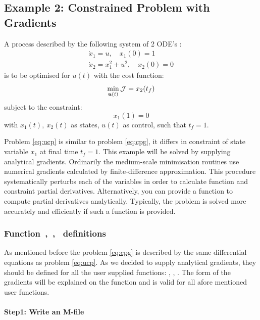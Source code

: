 \subsection{Example 2: Constrained Problem with Gradients}
\label{sec:conprobgrad}

A process described by the following system of 2
ODE's \citep{raj01,luu91}:   
\begin{gather}
\dot{x}_1 = u, \quad x_{1}(0) = 1\\
\dot{x}_2 = x^{2}_{1} + u^{2}, \quad x_{2}(0) = 0
\end{gather} is to be optimised for $u(t)$ with the cost function:
\begin{equation}
\min_{\ve{u}(t)} \mf{J} = x_{2}(t_{f}) \label{eq:cpg} 
\end{equation} subject to the constraint:
\begin{equation}
x_{1}(1) = 0
\end{equation} with $x_{1}(t),~x_{2}(t)$ as states, $u(t)$ as control,
such that $t_{f} = 1$. 

Problem \eqref{eq:ucp} is similar to problem \eqref{eq:cpg}, it 
differs in constraint of state variable $x_{1}$ at final time
$t_{f}=1$. This example will be solved by supplying analytical
gradients. Ordinarily the medium-scale minimisation routines use
numerical gradients calculated by finite-difference
approximation. This procedure systematically perturbs each of the
variables in order to calculate function and constraint partial
derivatives. Alternatively, you can provide a function to compute 
partial derivatives analytically. Typically, the problem is solved
more accurately and efficiently if such a function is provided. 

\subsubsection{Function~,~,~  definitions}
\label{sec:conprobgrad-fundef}

As mentioned before the problem \eqref{eq:cpg} is described by the
same differential equations as problem \eqref{eq:ucp}. As we decided
to supply analytical gradients, they should be defined for all the
user supplied functions: , ,
. The form of the gradients will be explained on the
function  and is valid for all afore mentioned user
functions.  

\paragraph{Step1: Write an M-file~}

